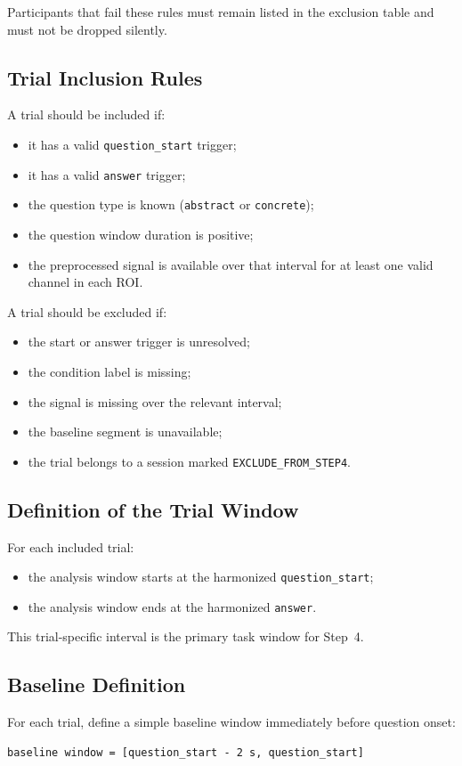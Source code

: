 \documentclass[11pt]{article}
\begin{document}
Participants that fail these rules must remain listed in the exclusion table and must not be dropped silently.

\subsection{Trial Inclusion Rules}
A trial should be included if:
\begin{itemize}
    \item it has a valid \texttt{question\_start} trigger;
    \item it has a valid \texttt{answer} trigger;
    \item the question type is known (\texttt{abstract} or \texttt{concrete});
    \item the question window duration is positive;
    \item the preprocessed signal is available over that interval for at least one valid channel in each ROI.
\end{itemize}

A trial should be excluded if:
\begin{itemize}
    \item the start or answer trigger is unresolved;
    \item the condition label is missing;
    \item the signal is missing over the relevant interval;
    \item the baseline segment is unavailable;
    \item the trial belongs to a session marked \texttt{EXCLUDE\_FROM\_STEP4}.
\end{itemize}

\subsection{Definition of the Trial Window}
For each included trial:
\begin{itemize}
    \item the analysis window starts at the harmonized \texttt{question\_start};
    \item the analysis window ends at the harmonized \texttt{answer}.
\end{itemize}

This trial-specific interval is the primary task window for Step~4.

\subsection{Baseline Definition}
For each trial, define a simple baseline window immediately before question onset:
\begin{verbatim}
baseline window = [question_start - 2 s, question_start]
\end{verbatim}
\end{document}
